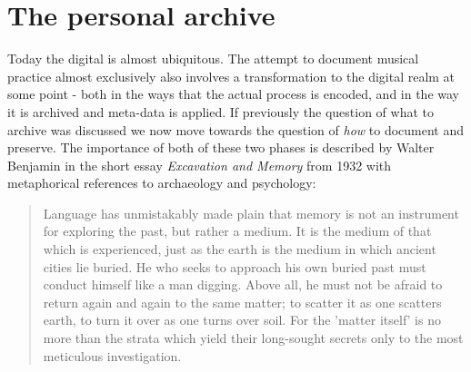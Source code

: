 \documentclass[11pt,a4paper]{article}
\begin{document}



\section*{The personal archive}
\label{sec:archiving-practice}
Today the digital is almost ubiquitous. The attempt to document musical practice almost exclusively also involves a transformation to the digital realm at some point - both in the ways that the actual process is encoded, and in the way it is archived and meta-data is applied. If previously the question of what to archive was discussed we now move towards the question of \emph{how} to document and preserve. The importance of both of these two phases is described by Walter Benjamin in the short essay \emph{Excavation and Memory} from 1932 with metaphorical references to archaeology and psychology:

\begin{quote}
Language has unmistakably made plain that memory is not an instrument for exploring the past, but rather a medium. It is the medium of that which is experienced, just as the earth is the medium in which ancient cities lie buried. He who seeks to approach his own buried past must conduct himself like a man digging. Above all, he must not be afraid to return again and again to the same matter; to scatter it as one scatters earth, to turn it over as one turns over soil. For the 'matter itself' is no more than the strata which yield their long-sought secrets only to the most meticulous investigation. \citep[p. 576]{benjamin2005}
\end{quote}
\end{document}
